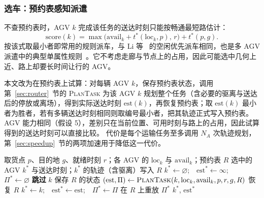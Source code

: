 \documentclass[manuscript,screen,review]{acmart}
\begin{document}
\subsubsection{选车：预约表感知派遣}
\label{sec:dispatch}

不查预约表时，AGV $k$ 完成该任务的送达时刻只能按畅通最短路估计：
\begin{equation}
\label{eq:rule}
\mathrm{score}(k)=\max\bigl(\mathrm{avail}_k+t^{*}(\mathrm{loc}_k,p),\,
r\bigr)+t^{*}(p,g).
\end{equation}
按该式取最小者即常用的规则派车，与 Li 等~\cite{li2026framework} 的空闲优先派车相同，也是多 AGV 派遣中的典型单属性规则~\cite{lu2022agv}。它不考虑走廊与节点上的占用，因此可能选中几何上近、路上却要长时间让行的 AGV。

本文改为在预约表上试算：对每辆 AGV $k$，保存预约表状态，调用第~\ref{sec:router}~节的 \textsc{PlanTask} 为该 AGV $k$ 规划整个任务（含必要的驱离与送达后的停放或离场），得到实际送达时刻 $\mathrm{est}(k)$，再恢复预约表；取 $\mathrm{est}(k)$ 最小者为胜者，若有多辆送达时刻相同则取编号最小者，把其轨迹正式写入预约表。
AGV 能力相同（假设 5），差别只在当前位置、可用时刻与路上的占用，因此试算得到的送达时刻可以直接比较。
代价是每个运输任务至多调用 $N_A$ 次轨迹规划，第~\ref{sec:speedup}~节的两项加速用于降低这一代价。

\begin{algorithm}[t]
\caption{\textsc{Plan}：下层的运输任务规划（选车与轨迹写入）}
\label{alg:dispatch}
\small
\begin{algorithmic}[1]
\Require 取货点 $p$、目的地 $g$、就绪时刻 $r$；各 AGV 的 $\mathrm{loc}_k$ 与 $\mathrm{avail}_k$；预约表 $R$
\Ensure 选中的 AGV $k^{*}$ 与送达时刻；$k^{*}$ 的轨迹（含驱离）写入 $R$
\State $k^{*}\gets\varnothing$;\ \ $\mathrm{est}^{*}\gets\infty$;\ \ $\Pi^{*}\gets\varnothing$
   \State \textbf{跳过} $k$  \EndIf
  \State 保存 $R$ 的状态
  \State $(\mathrm{est},\Pi)\gets\textsc{PlanTask}(k,\mathrm{loc}_k,\mathrm{avail}_k,p,r,g,R)$
  \State 恢复 $R$
   \State $k^{*}\gets k$;\ \ $\mathrm{est}^{*}\gets\mathrm{est}$;\ \ $\Pi^{*}\gets\Pi$ \EndIf
\EndFor
\State 在 $R$ 上重放 $\Pi^{*}$ 
\State \Return $k^{*}$, $\mathrm{est}^{*}$
\end{algorithmic}
\end{algorithm}
\end{document}
